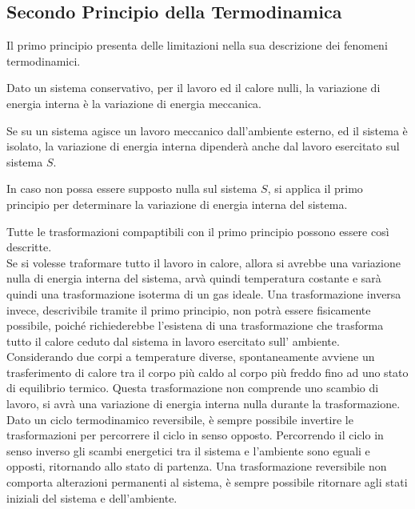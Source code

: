 \documentclass{article}
\numberwithin{equation}{subsection}
\begin{document}
\subsection{Secondo Principio della Termodinamica}


Il primo principio presenta delle limitazioni 
nella sua descrizione dei fenomeni termodinamici. 



Dato un sistema conservativo, per il lavoro ed il calore nulli, la variazione di energia interna è la variazione di energia meccanica. 



Se su un sistema agisce un lavoro meccanico dall'ambiente esterno, ed il sistema è isolato, la variazione di energia interna dipenderà anche dal lavoro esercitato sul 
sistema $S$. 



In caso non possa essere supposto nulla sul sistema $S$, si applica il primo principio per determinare la variazione di energia interna del sistema.



Tutte le trasformazioni compaptibili con il primo principio possono essere così descritte. 
\\
Se si volesse traformare tutto il 
lavoro in calore, allora si avrebbe una variazione nulla di energia 
interna del sistema, arvà quindi temperatura costante e sarà 
quindi una trasformazione isoterma di un gas ideale. Una 
trasformazione inversa invece, descrivibile tramite il primo 
principio, non potrà essere fisicamente possibile, poiché 
richiederebbe l'esistena di una trasformazione che trasforma 
tutto il calore ceduto dal sistema in lavoro esercitato sull'
ambiente. 
\\
Considerando due corpi a temperature diverse, spontaneamente 
avviene un trasferimento di calore tra il corpo più caldo al 
corpo più freddo fino ad uno stato di equilibrio 
termico. Questa trasformazione non comprende uno 
scambio di lavoro, si avrà una variazione di energia 
interna nulla durante la trasformazione. 
\\
Dato un ciclo termodinamico reversibile, è sempre possibile invertire le trasformazioni per percorrere il ciclo in senso opposto. Percorrendo 
il ciclo in senso inverso gli scambi energetici tra il sistema e l'ambiente sono eguali e opposti, ritornando allo stato di partenza. Una trasformazione reversibile non 
comporta alterazioni permanenti al sistema, è sempre possibile ritornare agli stati iniziali del sistema e dell'ambiente. 
\end{document}
